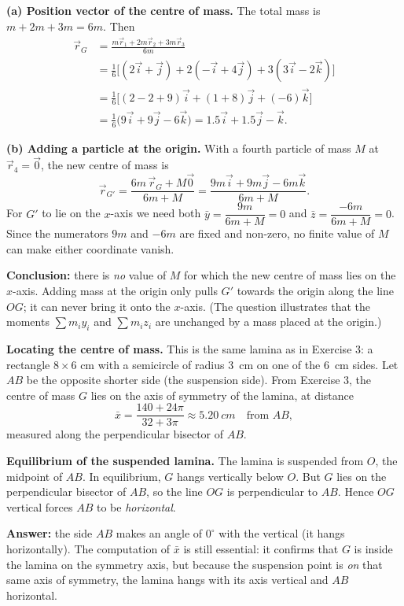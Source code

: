 \documentclass[11pt]{article}
\begin{document}
\begin{corrige}
\textbf{(a) Position vector of the centre of mass.} The total mass is $m + 2m + 3m = 6m$. Then
\begin{align*}
\vec{r}_G &= \frac{m\vec{r}_1 + 2m\vec{r}_2 + 3m\vec{r}_3}{6m}\\
&= \frac{1}{6}\Big[(2\vec{i}+\vec{j}) + 2(-\vec{i}+4\vec{j}) + 3(3\vec{i}-2\vec{k})\Big]\\
&= \frac{1}{6}\Big[(2-2+9)\vec{i} + (1+8)\vec{j} + (-6)\vec{k}\Big]\\
&= \frac{1}{6}\big(9\vec{i} + 9\vec{j} - 6\vec{k}\big)
= 1.5\vec{i} + 1.5\vec{j} - \vec{k}.
\end{align*}

\textbf{(b) Adding a particle at the origin.} With a fourth particle of mass $M$ at $\vec{r}_4 = \vec{0}$, the new centre of mass is
\[
\vec{r}_{G'} = \frac{6m\,\vec{r}_G + M\vec{0}}{6m + M} = \frac{9m\vec{i} + 9m\vec{j} - 6m\vec{k}}{6m+M}.
\]
For $G'$ to lie on the $x$-axis we need both $\bar{y} = \dfrac{9m}{6m+M} = 0$ and $\bar{z} = \dfrac{-6m}{6m+M} = 0$. Since the numerators $9m$ and $-6m$ are fixed and non-zero, no finite value of $M$ can make either coordinate vanish.

\textbf{Conclusion:} there is \emph{no} value of $M$ for which the new centre of mass lies on the $x$-axis. Adding mass at the origin only pulls $G'$ towards the origin along the line $OG$; it can never bring it onto the $x$-axis. (The question illustrates that the moments $\sum m_i y_i$ and $\sum m_i z_i$ are unchanged by a mass placed at the origin.)
\end{corrige}

\begin{corrige}
\textbf{Locating the centre of mass.} This is the same lamina as in Exercise 3: a rectangle $8 \times 6$ cm with a semicircle of radius \SI{3}{cm} on one of the \SI{6}{cm} sides. Let $AB$ be the opposite shorter side (the suspension side). From Exercise 3, the centre of mass $G$ lies on the axis of symmetry of the lamina, at distance
\[
\bar{x} = \frac{140 + 24\pi}{32 + 3\pi} \approx \SI{5.20}{cm} \quad \text{from } AB,
\]
measured along the perpendicular bisector of $AB$.

\textbf{Equilibrium of the suspended lamina.} The lamina is suspended from $O$, the midpoint of $AB$. In equilibrium, $G$ hangs vertically below $O$. But $G$ lies on the perpendicular bisector of $AB$, so the line $OG$ is perpendicular to $AB$. Hence $OG$ vertical forces $AB$ to be \emph{horizontal}.

\textbf{Answer:} the side $AB$ makes an angle of $\boxed{0^\circ}$ with the vertical (it hangs horizontally). The computation of $\bar{x}$ is still essential: it confirms that $G$ is inside the lamina on the symmetry axis, but because the suspension point is \emph{on} that same axis of symmetry, the lamina hangs with its axis vertical and $AB$ horizontal.
\end{corrige}
\end{document}

